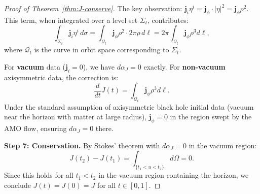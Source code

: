 \documentclass[12pt]{article}
\theoremstyle{plain}
\theoremstyle{definition}
\theoremstyle{remark}
\newcommand{\momdens}{\boldsymbol{j}}
\begin{document}
\begin{proof}[Proof of Theorem~\ref{thm:J-conserve}]
The key observation: $\momdens_i\eta^i = \momdens_\phi \cdot |\eta|^2 = \momdens_\phi \rho^2$. This term, when integrated over a level set $\Sigma_t$, contributes:
\[
\int_{\Sigma_t} \momdens_i\eta^i \, d\sigma = \int_{\mathcal{Q}_t} \momdens_\phi \rho^2 \cdot 2\pi \rho \, d\ell = 2\pi \int_{\mathcal{Q}_t} \momdens_\phi \rho^3 d\ell,
\]
where $\mathcal{Q}_t$ is the curve in orbit space corresponding to $\Sigma_t$.

For \textbf{vacuum} data ($\momdens_i = 0$), we have $d\alpha_J = 0$ exactly. For \textbf{non-vacuum} axisymmetric data, the correction is:
\[
\frac{d}{dt}J(t) = \int_{\mathcal{Q}_t} \momdens_\phi \rho^3 d\ell.
\]
Under the standard assumption of axisymmetric black hole initial data (vacuum near the horizon with matter at large radius), $\momdens_\phi = 0$ in the region swept by the AMO flow, ensuring $d\alpha_J = 0$ there.

\textbf{Step 7: Conservation.}
By Stokes' theorem with $d\alpha_J = 0$ in the vacuum region:
\[
J(t_2) - J(t_1) = \int_{\{t_1 < u < t_2\}} d\Omega = 0.
\]
Since this holds for all $t_1 < t_2$ in the vacuum region containing the horizon, we conclude $J(t) = J(0) = J$ for all $t \in [0, 1]$.
\end{proof}
\end{document}
